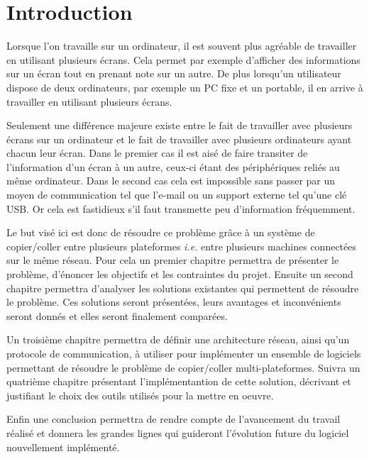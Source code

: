 \chapter*{Introduction}
\renewcommand{\leftmark}{INTRODUCTION}

Lorsque l'on travaille sur un ordinateur, il est souvent plus agréable
de travailler en utilisant plusieurs écrans. Cela permet par exemple
d'afficher des informations sur un écran tout en prenant note sur un autre.
De plus lorsqu'un utilisateur dispose de deux ordinateurs, par exemple
un PC fixe et un portable, il en arrive à travailler en utilisant plusieurs
écrans.

Seulement une différence majeure existe entre le fait de travailler
avec plusieurs écrans sur un ordinateur et le fait de travailler avec
plusieurs ordinateurs ayant chacun leur écran. Dans le premier cas il est
aisé de faire transiter de l'information d'un écran à un autre, ceux-ci
étant des périphériques reliés au même ordinateur. Dans le second cas
cela est impossible sans passer par un moyen de communication tel que l'e-mail
ou un support externe tel qu'une clé USB. Or cela est fastidieux
s'il faut transmette peu d'information fréquemment.

Le but visé ici est donc de résoudre ce problème grâce
à un système de copier/coller entre plusieurs plateformes \emph{i.e.} entre
plusieurs machines connectées sur le même réseau.
Pour cela un premier chapitre permettra de présenter le problème, d'énoncer
les objectifs et les contraintes du projet. Ensuite un second chapitre
permettra d'analyser les solutions existantes qui permettent de résoudre
le problème. Ces solutions seront présentées, leurs avantages et inconvénients
seront donnés et elles seront finalement comparées.

Un troisième chapitre
permettra de définir une architecture réseau, ainsi qu'un protocole de
communication, à utiliser pour implémenter un ensemble de logiciels
permettant de résoudre le problème de copier/coller multi-plateformes.
Suivra un quatrième chapitre présentant l'implémentantion de cette solution,
décrivant et justifiant le choix des outils utilisés pour la mettre en
oeuvre.

Enfin une conclusion permettra de rendre compte de l'avancement du travail
réalisé et donnera les grandes lignes qui guideront l'évolution future
du logiciel nouvellement implémenté.